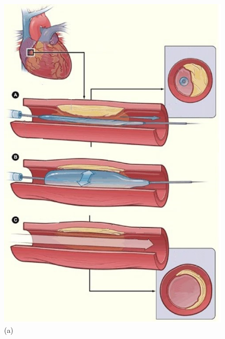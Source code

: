 \begin{figure}[H]
     \begin{minipage}{.50\linewidth}
      \centering
      \includegraphics[scale=0.5]{./02_chaps/cap_review/figure/balloon.jpg}\\
      (a)
     \end{minipage}%
     \begin{minipage}{.50\linewidth}
      \centering

\end{minipage}
\end{figure}

